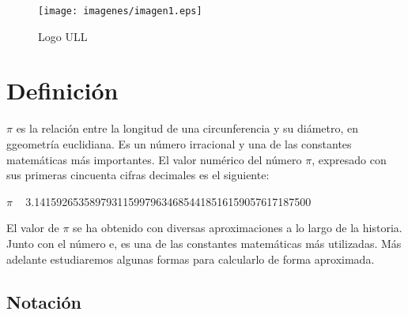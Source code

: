 \documentclass[spanish,a4paper,10pt]{article}
\begin{document}
\begin{figure}[!th]
\begin{center}
\texttt{[image: imagenes/imagen1.eps]}
\caption{Logo ULL}
\label{fig:1}
\end{center}
\end{figure}

\title{}
\author{Iciar González Alonso \\ Primer curso del Grado de Matemáticas en la ULL \\ Práctica de Laboratorio \#10}
\date{11 de abril de 2014}

\maketitle

\begin{abstract}
El objetivo de esta práctica es entregar un artículo escrito en \LaTeX{} que verse sobre el número $\pi$.
Con este ejercicio de laboratorio se pretende sintetizar las habilidades adquiridas en la comunicación escrita.
Para ello, trataremos varios puntos tanto técnicos como prácticos sobre este número.
\end{abstract}

\pagebreak

\thispagestyle{empty}
\section{Definición}

$\pi$ es la relación entre la longitud de una circunferencia y su diámetro, en ggeometría euclidiana. Es un número irracional y una de las constantes matemáticas más importantes. 
El valor numérico del número $\pi$, expresado con sus primeras cincuenta cifras decimales es el siguiente: 
\begin{center}
$\pi$ ~ 3.14159265358979311599796346854418516159057617187500
\end{center}

El valor de $\pi$ se ha obtenido con diversas aproximaciones a lo largo de la historia. Junto con el número e, es una de las constantes matemáticas más utilizadas. Más adelante estudiaremos algunas formas para calcularlo de forma aproximada.

\subsection{Notación}
\end{document}
